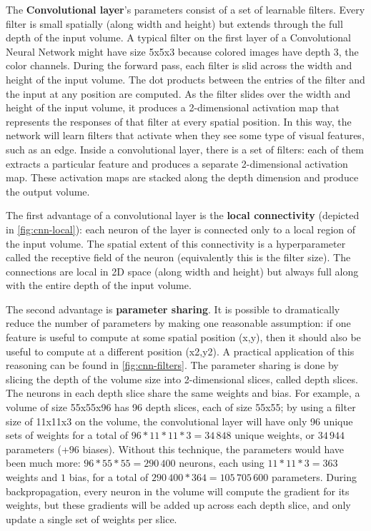 The \textbf{Convolutional layer}’s parameters consist of a set of learnable filters. Every filter is small spatially (along width and height) but extends through the full depth of the input volume.
A typical filter on the first layer of a Convolutional Neural Network might have size 5x5x3 because colored images have depth 3, the color channels.
During the forward pass, each filter is slid across the width and height of the input volume. The dot products between the entries of the filter and the input at any position are computed.
As the filter slides over the width and height of the input volume, it produces a 2-dimensional activation map that represents the responses of that filter at every spatial position.
In this way, the network will learn filters that activate when they see some type of visual features, such as an edge.
Inside a convolutional layer, there is a set of filters: each of them extracts a particular feature and produces a separate 2-dimensional activation map.
These activation maps are stacked along the depth dimension and produce the output volume.

The first advantage of a convolutional layer is the \textbf{local connectivity} (depicted in \autoref{fig:cnn-local}): each neuron of the layer is connected only to a local region of the input volume.
The spatial extent of this connectivity is a hyperparameter called the receptive field of the neuron (equivalently this is the filter size). The connections are local in 2D space (along width and height) but always full along with the entire depth of the input volume.

The second advantage is \textbf{parameter sharing}.
It is possible to dramatically reduce the number of parameters by making one reasonable assumption: if one feature is useful to compute at some spatial position (x,y), then it should also be useful to compute at a different position (x2,y2).
A practical application of this reasoning can be found in \autoref{fig:cnn-filters}.
The parameter sharing is done by slicing the depth of the volume size into 2-dimensional slices, called depth slices. The neurons in each depth slice share the same weights and bias.
For example, a volume of size 55x55x96 has 96 depth slices, each of size 55x55; by using a filter size of 11x11x3 on the volume, the convolutional layer will have only 96 unique sets of weights for a total of $96*11*11*3 = 34\,848$ unique weights, or $34\,944$ parameters (+$96$ biases).
Without this technique, the parameters would have been much more: $96*55*55 = 290\,400$ neurons, each using $11*11*3 = 363$ weights and $1$ bias, for a total of $290\,400 * 364 = 105\,705\,600$ parameters.
During backpropagation, every neuron in the volume will compute the gradient for its weights, but these gradients will be added up across each depth slice, and only update a single set of weights per slice.

